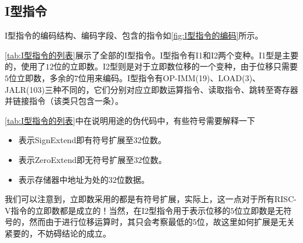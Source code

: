 \subsection{I型指令}
I型指令的编码结构、编码字段、包含的指令如\cref{fig:I型指令的编码}所示。

\begin{Figure}[I型指令的编码]

\end{Figure}
\cref{tab:I型指令的列表}展示了全部的I型指令。I型指令有I1和I2两个变种。I1型是主要的，使用了$12$位的立即数。I2型则是对于立即数位移的一个变种，由于位移只需要$5$位立即数，多余的$7$位用来编码。I型指令有OP-IMM(19)、LOAD(3)、JALR(103)三种不同的，它们分别对应立即数运算指令、读取指令、跳转至寄存器并链接指令（该类只包含一条）。

\cref{tab:I型指令的列表}中在说明用途的伪代码中，有些符号需要解释一下
\begin{itemize}
    \item {}表示SignExtend即有符号扩展至$32$位数。
    \item {}表示ZeroExtend即无符号扩展至$32$位数。
    \item \code{[Address]}表示存储器中地址为处的$32$位数据。
\end{itemize}
我们可以注意到，立即数采用的都是有符号扩展，实际上，这一点对于所有RISC-V指令的立即数都是成立的！当然，在I2型指令用于表示位移的$5$位立即数是无符号的，然而由于进行位移运算时，其只会考察最低的$5$位，故这里如何扩展是无关紧要的，不妨碍结论的成立。

